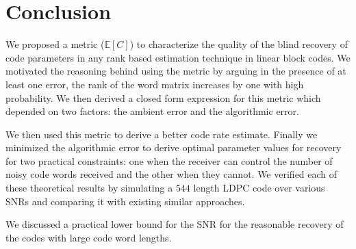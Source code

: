 \documentclass[conference]{IEEEtran}
\begin{document}
\section{Conclusion}
We proposed a metric ($\mathbb{E}[C]$) to characterize the quality of the blind recovery of code parameters in any rank based estimation technique in linear block codes. We motivated the reasoning behind using the metric by arguing in the presence of at least one error, the rank of the word matrix increases by one with high probability. We then derived a closed form expression for this metric which depended on two factors: the ambient error and the algorithmic error. 

We then used this metric to derive a better code rate estimate. Finally we minimized the algorithmic error to derive optimal parameter values for recovery for two practical constraints: one when the receiver can control the number of noisy code words received and the other when they cannot. We verified each of these theoretical results by simulating a $544$ length LDPC code over various SNRs and comparing it with existing similar approaches.

We discussed a practical lower bound for the SNR for the reasonable recovery of the codes with large code word lengths.




\appendices
\end{document}
